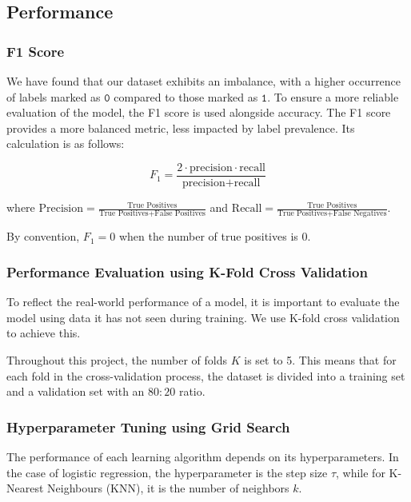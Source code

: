 \documentclass[12pt]{article}
\begin{document}
\subsection{Performance}

\subsubsection{F1 Score}


We have found that our dataset exhibits an imbalance, with a higher occurrence of labels marked as $\mathtt{0}$ compared to those marked as $\mathtt{1}$. 
To ensure a more reliable evaluation of the model, the F1 score\cite{F1score} is used alongside accuracy. The F1 score provides a more balanced metric, less impacted by label prevalence. Its calculation is as follows:

$$
F_1 = \frac{2 \cdot \text{precision} \cdot \text{recall}}{\text{precision} + \text{recall}}
$$

\noindent where $\text{Precision} = \frac{\text{True Positives}}{\text{True Positives} + \text{False Positives}}$ and $\text{Recall} = \frac{\text{True Positives}}{\text{True Positives} + \text{False Negatives}}$. 

\vspace{3pt}

By convention, $F_1 = 0$ when the number of true positives is 0.


\subsubsection{Performance Evaluation using K-Fold Cross Validation}

\indent To reflect the real-world performance of a model, it is important to evaluate the model using data it has not seen during training. We use K-fold cross validation to achieve this. 


Throughout this project, the number of folds $K$ is set to 5. This means that for each fold in the cross-validation process, the dataset is divided into a training set and a validation set with an $80:20$ ratio.


\subsubsection{Hyperparameter Tuning using Grid Search}


The performance of each learning algorithm depends on its hyperparameters. In the case of logistic regression, the hyperparameter is the step size \(\tau\), while for K-Nearest Neighbours (KNN), it is the number of neighbors \(k\).
\end{document}

